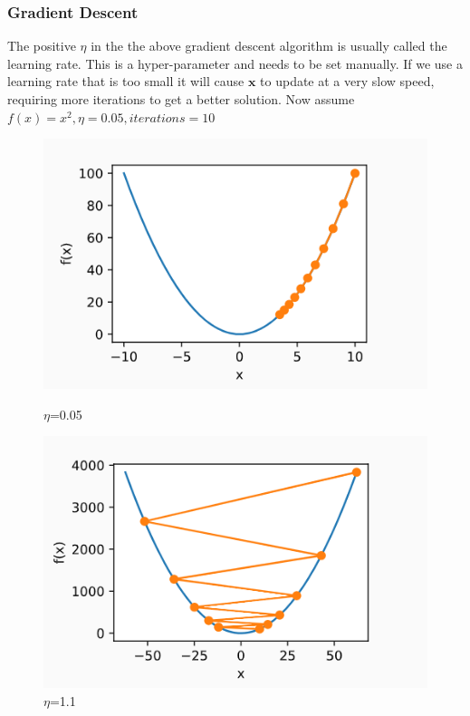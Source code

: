 \documentclass[cjk]{beamer}
\begin{document}
\begin{CJK*}{GBK}{kai}
\begin{frame}
\frametitle{Gradient Descent}
The positive $\eta$ in the the above gradient descent algorithm is usually called the learning rate.
This is a hyper-parameter and needs to be set manually. If we use a learning rate that is too small
it will cause $\mathbf{x}$ to update at a very slow speed, requiring more iterations to get a better solution.
Now assume $f(x)=x^2,\eta=0.05,iterations=10$\\
\begin{figure}
	\begin{minipage}[t]{0.49\linewidth} %
		\centering
		\includegraphics[width= \textwidth]{n05.png}
		\caption{$\eta$=0.05}
		\label{fig:side:a}
	\end{minipage}%
	\begin{minipage}[t]{0.49\linewidth}
		\centering
		\includegraphics[width= \textwidth]{n11.png}
		\caption{$\eta$=1.1}
	\end{minipage}
\end{figure}
\end{frame}


\end{CJK*}
\end{document}
